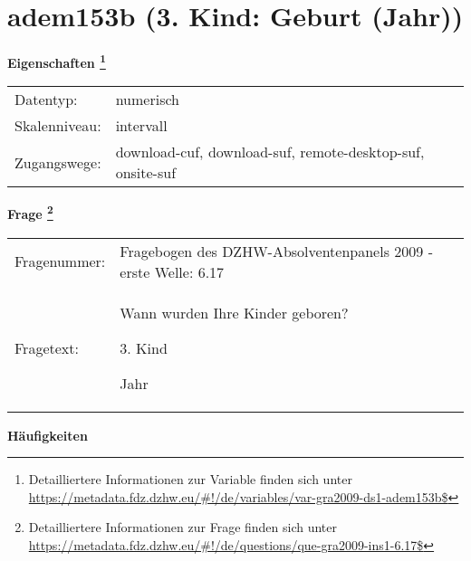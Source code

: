 
    \setcounter{footnote}{0}

    \vspace*{-1.8cm}
	\section{adem153b (3. Kind: Geburt (Jahr))}
	\label{section:adem153b}



    \vspace*{0.5cm}
    \noindent\textbf{Eigenschaften
	\footnote{Detailliertere Informationen zur Variable finden sich unter
		\url{https://metadata.fdz.dzhw.eu/\#!/de/variables/var-gra2009-ds1-adem153b$}}}\\
	\begin{tabularx}{\hsize}{@{}lX}
	Datentyp: & numerisch \\
	Skalenniveau: & intervall \\
	Zugangswege: &
	  download-cuf, 
	  download-suf, 
	  remote-desktop-suf, 
	  onsite-suf
 \\
    \end{tabularx}



				\vspace*{0.5cm}
                \noindent\textbf{Frage
	                \footnote{Detailliertere Informationen zur Frage finden sich unter
		              \url{https://metadata.fdz.dzhw.eu/\#!/de/questions/que-gra2009-ins1-6.17$}}}\\
				\begin{tabularx}{\hsize}{@{}lX}
					Fragenummer: &
					  Fragebogen des DZHW-Absolventenpanels 2009 - erste Welle:
					  6.17
 \\
					Fragetext: & Wann wurden Ihre Kinder geboren?\par  3. Kind\par  Jahr \\
				\end{tabularx}





        		\vspace*{0.5cm}
                \noindent\textbf{Häufigkeiten}

